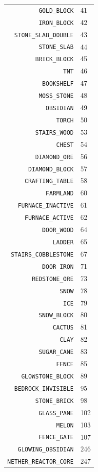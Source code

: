 \documentclass[twocolumn]{geocraft-worksheet-multipage}
\begin{document}
\begin{center}
\begin{supertabular} { | r | l | }
\verb|GOLD_BLOCK|          &   41 \\
\verb|IRON_BLOCK|          &   42 \\
\verb|STONE_SLAB_DOUBLE|   &   43 \\
\verb|STONE_SLAB|          &   44 \\
\verb|BRICK_BLOCK|         &   45 \\
\verb|TNT|                 &   46 \\
\verb|BOOKSHELF|           &   47 \\
\verb|MOSS_STONE|          &   48 \\
\verb|OBSIDIAN|            &   49 \\
\verb|TORCH|               &   50 \\
\verb|STAIRS_WOOD|         &   53 \\
\verb|CHEST|               &   54 \\
\verb|DIAMOND_ORE|         &   56 \\
\verb|DIAMOND_BLOCK|       &   57 \\
\verb|CRAFTING_TABLE|      &   58 \\
\verb|FARMLAND|            &   60 \\
\verb|FURNACE_INACTIVE|    &   61 \\
\verb|FURNACE_ACTIVE|      &   62 \\
\verb|DOOR_WOOD|           &   64 \\
\verb|LADDER|              &   65 \\
\verb|STAIRS_COBBLESTONE|  &   67 \\
\verb|DOOR_IRON|           &   71 \\
\verb|REDSTONE_ORE|        &   73 \\
\verb|SNOW|                &   78 \\
\verb|ICE|                 &   79 \\
\verb|SNOW_BLOCK|          &   80 \\
\verb|CACTUS|              &   81 \\
\verb|CLAY|                &   82 \\
\verb|SUGAR_CANE|          &   83 \\
\verb|FENCE|               &   85 \\
\verb|GLOWSTONE_BLOCK|     &   89 \\
\verb|BEDROCK_INVISIBLE|   &   95 \\
\verb|STONE_BRICK|         &   98 \\
\verb|GLASS_PANE|          &  102 \\
\verb|MELON|               &  103 \\
\verb|FENCE_GATE|          &  107 \\
\verb|GLOWING_OBSIDIAN|   &  246 \\
\verb|NETHER_REACTOR_CORE| &  247 \\
    \end{supertabular}
\end{center}
\end{document}
